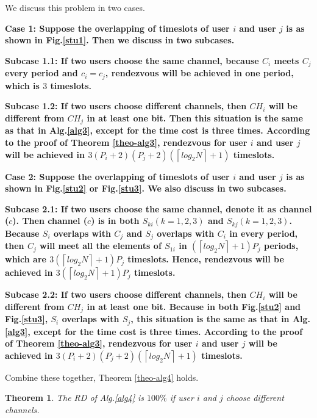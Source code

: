 \documentclass[10pt, conference, letterpaper]{IEEEtran}
\newtheorem{theorem}{Theorem}
\begin{document}
\begin{IEEEproof}
We discuss this problem in two cases.

\bfseries Case 1: \mdseries Suppose the overlapping of timeslots of user $i$ and user $j$ is as shown in Fig.\ref{stu1}. Then we discuss in two subcases.

\bfseries Subcase 1.1: \mdseries If two users choose the same channel, because $C_i$ meets $C_j$ every period and $c_i =c_j$, rendezvous will be achieved in one period, which is $3$ timeslots.

\bfseries Subcase 1.2: \mdseries If two users choose different channels, then $CH_i$ will be different from $CH_j$ in at least one bit. Then this situation is the same as that in Alg.\ref{alg3}, except for the time cost is three times. According to the proof of Theorem \ref{theo-alg3}, rendezvous for user $i$ and user $j$ will be achieved in  $3(P_i+2)(P_j+2)(\left \lceil log_2N \right \rceil +1)$ timeslots.

\bfseries Case 2: \mdseries Suppose the overlapping of timeslots of user $i$ and user $j$ is as shown in Fig.\ref{stu2} or Fig.\ref{stu3}.
We also discuss in two subcases.

\bfseries Subcase 2.1: \mdseries If two users choose the same channel, denote it as channel ($c$). Then channel ($c$) is in both $S_{ki} (k = 1,2,3)$ and $S_{kj} (k = 1,2,3)$. Because $S_i$ overlaps with $C_j$ and $S_j$ overlaps with $C_i$ in every period, then $C_j$ will meet all the elements of $S_{1i}$ in $(\left \lceil log_2N \right \rceil +1)P_j$ periods, which are $3(\left \lceil log_2N \right \rceil +1)P_j$ timeslots. Hence, rendezvous will be achieved in $3(\left \lceil log_2N \right \rceil +1)P_j$ timeslots.

\bfseries Subcase 2.2: \mdseries If two users choose different channels, then $CH_i$ will be different from $CH_j$ in at least one bit. Because in both Fig.\ref{stu2} and Fig.\ref{stu3}, $S_i$ overlaps with $S_j$, this situation is the same as that in Alg.\ref{alg3}, except for the time cost is three times. According to the proof of Theorem \ref{theo-alg3}, rendezvous for user $i$ and user $j$ will be achieved in  $3(P_i+2)(P_j+2)(\left \lceil log_2N \right \rceil +1)$ timeslots.

Combine these together, Theorem \ref{theo-alg4} holds.
\end{IEEEproof}

\begin{theorem}
The RD of Alg.\ref{alg4} is $100\%$ if user $i$ and $j$ choose different channels.
\end{theorem}
\end{document}
